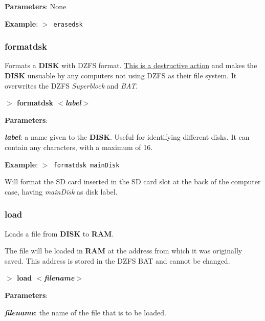 \documentclass[a4paper,11pt]{article}
\begin{document}
        \textbf{Parameters}: None

        \textbf{Example}: \texttt{$>$ erasedsk}

        \subsubsection{{\color{blue}formatdsk}}
        Formats a \textbf{DISK} with DZFS format. \underline{This is a
        destructive action} and makes the \textbf{DISK} unsuable by any
        computers not using DZFS as their file system. It overwrites the DZFS
        \textit{Superblock} and \textit{BAT}.

        \hspace{1.9cm}\textbf{$>$ formatdsk \textit{$<$label$>$}}

        \textbf{Parameters}:

        \hspace{1cm}\textbf{\textit{label}}: a name given to the \textbf{DISK}.
        Useful for identifying different disks. It can contain any characters,
        with a maximum of 16.

        \textbf{Example}: \texttt{$>$ formatdsk mainDisk}

        Will format the SD card inserted in the SD card slot at the back of the
        computer case, having \textit{mainDisk} as disk label.

        \subsubsection{{\color{blue}load}}
        Loads a file from \textbf{DISK} to \textbf{RAM}.
        
        The file will be loaded in \textbf{RAM} at the address from which it was
        originally saved. This address is stored in the DZFS BAT and cannot be
        changed. 

        \hspace{1.9cm}\textbf{$>$ load \textit{$<$filename$>$}}

        \textbf{Parameters}:

        \hspace{1cm}\textbf{\textit{filename}}: the name of the file that is to
        be loaded.
\end{document}

